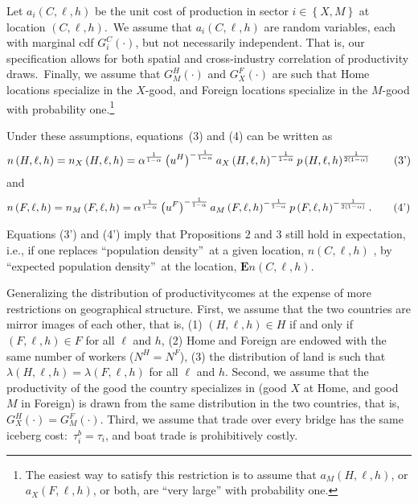 \documentclass[12pt]{article}
\begin{document}
Let $a_{i}\left( C,\ell
,h\right) $ be the unit cost of production in sector $i\in \left \{
X,M\right \} $ at location $\left( C,\ell ,h\right) $.\ We assume that $%
a_{i}\left( C,\ell ,h\right) $ are random variables, each with marginal cdf $%
G_{i}^{C}\left( \cdot \right) $, but not necessarily independent. That is,
our specification allows for both spatial and cross-industry correlation of
productivity draws.\ Finally, we assume that $G_{M}^{H}\left( \cdot \right) $
and $G_{X}^{F}\left( \cdot \right) $ are such that Home locations specialize
in the $X$-good, and Foreign locations specialize in the $M$-good with
probability one.\footnote{%
The easiest way to satisfy this restriction is to assume that $a_{M}\left(
H,\ell ,h\right) $, or $a_{X}\left( F,\ell ,h\right) $, or both, are ``very
large'' with probability one.}

Under these assumptions, equations\ (3) and (4) can be written as%
\begin{equation}
n\left( H,\ell ,h\right) =n_{X}\left( H,\ell ,h\right) =\alpha ^{\frac{1}{%
1-\alpha }}\left( u^{H}\right) ^{-\frac{1}{1-\alpha }}a_{X}\left( H,\ell
,h\right) ^{-\frac{1}{1-\alpha }}p\left( H,\ell ,h\right) ^{\frac{1}{2\left(
1-\alpha \right) }}  \tag{3'}
\end{equation}%
and%
\begin{equation}
n\left( F,\ell ,h\right) =n_{M}\left( F,\ell ,h\right) =\alpha ^{\frac{1}{%
1-\alpha }}\left( u^{F}\right) ^{-\frac{1}{1-\alpha }}a_{M}\left( F,\ell
,h\right) ^{-\frac{1}{1-\alpha }}p\left( F,\ell ,h\right) ^{-\frac{1}{%
2\left( 1-\alpha \right) }}.  \tag{4'}
\end{equation}

Equations (3') and (4') imply that Propositions $2$ and $3$ still hold in
expectation, i.e., if one replaces \textquotedblleft population
density\textquotedblright \ at a given location, $n\left( C,\ell ,h\right) $%
, by \textquotedblleft expected population density\textquotedblright \ at
the location, $\mathbf{E}n\left( C,\ell ,h\right) $.

Generalizing the distribution of productivitycomes at the expense of more restrictions on geographical structure. First, we assume that the
two countries are mirror images of each other, that is, (1) $\left( H,\ell
,h\right) \in H$ if and only if $\left( F,\ell ,h\right) \in F$ for all $%
\ell $ and $h$, (2) Home and Foreign are endowed with the same number of
workers ($N^{H}=N^{F}$), (3) the distribution of land is such that $\lambda
\left( H,\ell ,h\right) =\lambda \left( F,\ell ,h\right) $ for all $\ell $
and $h$. Second, we assume that the productivity of the good the country
specializes in (good $X$ at Home, and good $M$ in Foreign) is drawn from the
same distribution in the two countries, that is, $G_{X}^{H}\left( \cdot
\right) =G_{M}^{F}\left( \cdot \right) $. Third, we assume that trade over
every bridge has the same iceberg cost:\ $\tau _{i}^{b}=\tau _{i}$, and boat
trade is prohibitively costly.
\end{document}
